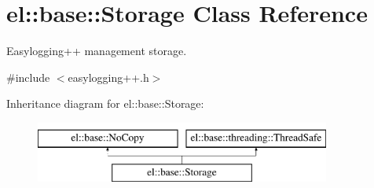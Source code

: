 \hypertarget{classel_1_1base_1_1Storage}{\section{el\-:\-:base\-:\-:Storage Class Reference}
\label{classel_1_1base_1_1Storage}
}


Easylogging++ management storage.  




{\ttfamily \#include $<$easylogging++.\-h$>$}

Inheritance diagram for el\-:\-:base\-:\-:Storage\-:\begin{figure}[H]
\begin{center}
\leavevmode
\includegraphics[height=2.000000cm]{classel_1_1base_1_1Storage}
\end{center}
\end{figure}
